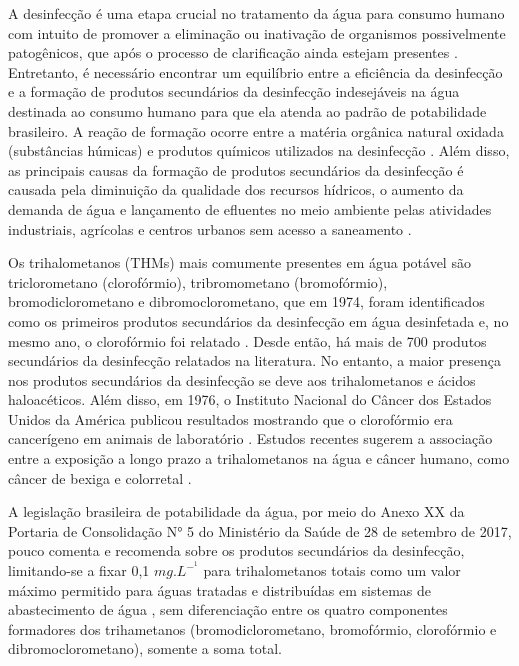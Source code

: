 A desinfecção é uma etapa crucial no tratamento da água para consumo humano com intuito de promover a eliminação ou inativação de organismos possivelmente patogênicos, que após o processo de clarificação ainda estejam presentes \cite{who17}. Entretanto, é necessário encontrar um equilíbrio entre a eficiência da desinfecção e a formação de produtos secundários da desinfecção indesejáveis na água destinada ao consumo humano para que ela atenda ao padrão de potabilidade brasileiro. A reação de formação ocorre entre a matéria orgânica natural oxidada (substâncias húmicas) e produtos químicos utilizados na desinfecção \cite{DU201751}. Além disso, as principais causas da formação de produtos secundários da desinfecção é causada pela diminuição da qualidade dos recursos hídricos, o aumento da demanda de água e lançamento de efluentes no meio ambiente pelas atividades industriais, agrícolas e centros urbanos sem acesso a saneamento \cite{sun2016characteristics}. 


Os trihalometanos (THMs) mais comumente presentes em água potável são triclorometano (clorofórmio), tribromometano (bromofórmio), bromodiclorometano e dibromoclorometano, que em 1974, foram  identificados como os primeiros produtos secundários da desinfecção em água desinfetada  \cite{bellar1974occurrence} e, no mesmo ano, o clorofórmio foi relatado  \cite{rook1974}. Desde então, há mais de 700 produtos secundários da desinfecção relatados na literatura. No entanto, a maior presença nos produtos secundários da desinfecção se deve aos trihalometanos e ácidos haloacéticos. Além disso, em 1976, o Instituto Nacional do Câncer dos Estados Unidos da América publicou resultados mostrando que o clorofórmio era cancerígeno em animais de laboratório \cite{national1976report}. Estudos recentes sugerem a associação entre a exposição a longo prazo a trihalometanos na água e câncer humano, como câncer de bexiga e colorretal \cite{cancer,cancerdebexiga}.

A legislação brasileira de potabilidade da água, por meio do Anexo XX da Portaria de Consolidação N° 5 do Ministério da Saúde de 28 de setembro de 2017, pouco comenta e recomenda sobre os produtos secundários da desinfecção, limitando-se a fixar 0,1 $mg.L^-^1$ para trihalometanos totais como um valor máximo permitido para águas tratadas e distribuídas em sistemas de abastecimento de água \cite{AnexoXX}, sem diferenciação entre os quatro componentes formadores dos trihametanos (bromodiclorometano, bromofórmio, clorofórmio e dibromoclorometano), somente a soma total.

